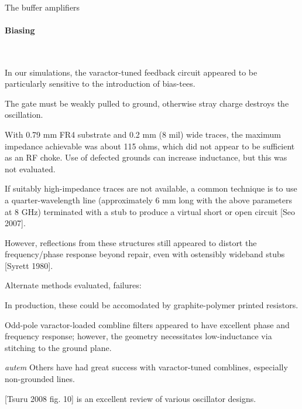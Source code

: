 \documentclass[fleqn,10pt]{article}
\begin{document}
\begin{multicols}{1}
\paragraph{}
The buffer amplifiers 

\paragraph{Biasing}\

In our simulations, the varactor-tuned feedback circuit appeared to be particularly sensitive to the introduction of bias-tees. 


The gate must be weakly pulled to ground, otherwise stray charge destroys the oscillation.




With 0.79 mm FR4 substrate and 0.2 mm (8 mil) wide traces, the maximum impedance achievable was about 115 ohms, which did not appear to be sufficient as an RF choke. Use of defected grounds can increase inductance, but this was not evaluated.

If suitably high-impedance traces are not available, a common technique is to use a quarter-wavelength line (approximately 6 mm long with the above parameters at 8 GHz) terminated with a stub to produce a virtual short or open circuit [Seo 2007]. 

However, reflections from these structures still appeared to distort the frequency/phase response beyond repair, even with ostensibly wideband stubs [Syrett 1980].

\noindent{}

Alternate methods evaluated, failures: 


In production, these could be accomodated by graphite-polymer printed resistors. 


Odd-pole varactor-loaded combline filters appeared to have excellent phase and frequency response; however, the geometry necessitates low-inductance via stitching to the ground plane.

\begin{autem}
	{\it autem} Others have had great success with varactor-tuned comblines, especially non-grounded lines.
\end{autem}

[Tsuru 2008 fig. 10] is an excellent review of various oscillator designs.


\end{multicols}
\end{document}
